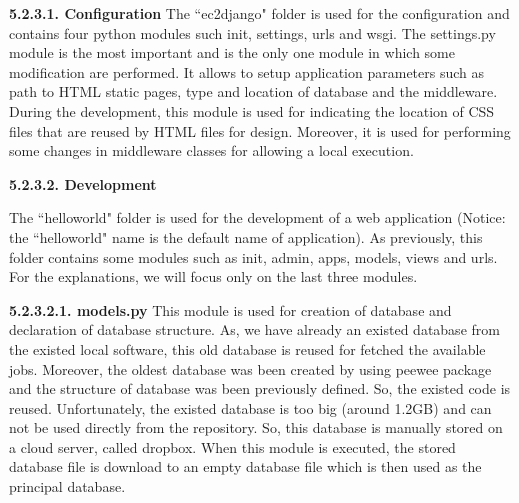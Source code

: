 \documentclass[conference,compsoc]{IEEEtran}
\begin{document}
\noindent
\newline\newline
\textbf{5.2.3.1. Configuration}
\newline
The ``ec2django" folder is used for the configuration and contains four python modules such init, settings, urls and wsgi. The settings.py module is the most important and is the only one module in which some modification are performed. It allows to setup application parameters such as path to HTML static pages, type and location of database and the middleware.
\newline
During the development, this module is used for indicating the location of CSS files that are reused by HTML files for design. Moreover, it is used for performing some changes in middleware classes for allowing a local execution. 

\noindent
\newline\newline
\textbf{5.2.3.2. Development}
\newline

The ``helloworld" folder is used for the development of a web application (Notice: the ``helloworld" name is the default name of application). As previously, this folder contains some modules such as init, admin, apps, models, views and urls. For the explanations, we will focus only on the last three modules.

\noindent
\newline\newline
\textbf{5.2.3.2.1. models.py}
\newline\newline
This module is used for creation of database and declaration of database structure. As, we have already an existed database from the existed local software, this old database is reused for fetched the available jobs. Moreover, the oldest database was been created by using peewee package and the structure of database was been previously defined. So, the existed code is reused.  
\newline
Unfortunately, the existed database is too big (around 1.2GB) and can not be used directly from the repository. So, this database is manually stored on a cloud server, called dropbox. 
\newline
When this module is executed, the stored database file is download to an empty database file which is then used as the principal database. 
\end{document}
